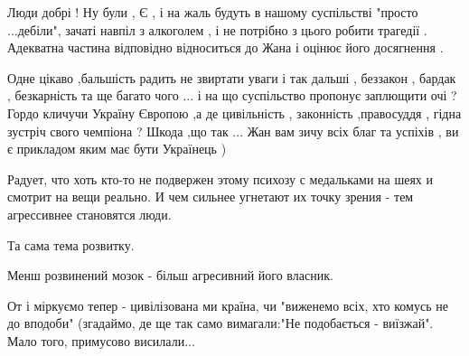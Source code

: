 \begin{itemize}
 

Люди добрі ! Ну були , Є , і на жаль будуть в нашому суспільстві "просто
...дебіли", зачаті навпіл з алкоголем , і не потрібно з цього робити трагедії .
Адекватна частина відповідно відноситься до
Жана і оцінює його досягнення .

 

Одне цікаво ,бальшість радить не звиртати уваги і так дальші , беззакон ,
бардак , безкарність та ще багато чого ... і на що суспільство пропонує заплющити
очі ? Гордо кличучи Україну Європою ,а де цивільність , законність ,правосуддя
, гідна зустріч свого чемпіона ? Шкода ,що так ... Жан вам зичу всіх благ та
успіхів , ви є прикладом яким має бути Українець )


 

Радует, что хоть кто-то не подвержен этому психозу с медальками на шеях и
смотрит на вещи реально. И чем сильнее угнетают их точку зрения - тем
агрессивнее становятся люди.

 

Та сама тема розвитку.

Менш розвинений мозок - більш агресивний його власник.

От і міркуємо тепер - цивілізована ми країна, чи "виженемо всіх, хто комусь не
до вподоби" (згадаймо, де ще так само вимагали:"Не подобається - виїзжай". Мало
того, примусово висилали...


 


\end{itemize}

